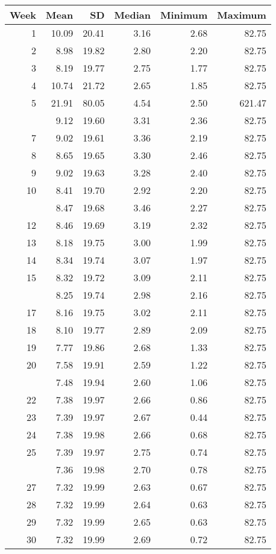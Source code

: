 \documentclass[10pt,letterpaper]{article}
\begin{document}
\begin{tabular}{rrrrrr}
\toprule
Week & Mean & SD & Median & Minimum & Maximum\\
\midrule
1 & 10.09 & 20.41 & 3.16 & 2.68 & 82.75\\
2 & 8.98 & 19.82 & 2.80 & 2.20 & 82.75\\
3 & 8.19 & 19.77 & 2.75 & 1.77 & 82.75\\
4 & 10.74 & 21.72 & 2.65 & 1.85 & 82.75\\
5 & 21.91 & 80.05 & 4.54 & 2.50 & 621.47\\
\addlinespace
6 & 9.12 & 19.60 & 3.31 & 2.36 & 82.75\\
7 & 9.02 & 19.61 & 3.36 & 2.19 & 82.75\\
8 & 8.65 & 19.65 & 3.30 & 2.46 & 82.75\\
9 & 9.02 & 19.63 & 3.28 & 2.40 & 82.75\\
10 & 8.41 & 19.70 & 2.92 & 2.20 & 82.75\\
\addlinespace
11 & 8.47 & 19.68 & 3.46 & 2.27 & 82.75\\
12 & 8.46 & 19.69 & 3.19 & 2.32 & 82.75\\
13 & 8.18 & 19.75 & 3.00 & 1.99 & 82.75\\
14 & 8.34 & 19.74 & 3.07 & 1.97 & 82.75\\
15 & 8.32 & 19.72 & 3.09 & 2.11 & 82.75\\
\addlinespace
16 & 8.25 & 19.74 & 2.98 & 2.16 & 82.75\\
17 & 8.16 & 19.75 & 3.02 & 2.11 & 82.75\\
18 & 8.10 & 19.77 & 2.89 & 2.09 & 82.75\\
19 & 7.77 & 19.86 & 2.68 & 1.33 & 82.75\\
20 & 7.58 & 19.91 & 2.59 & 1.22 & 82.75\\
\addlinespace
21 & 7.48 & 19.94 & 2.60 & 1.06 & 82.75\\
22 & 7.38 & 19.97 & 2.66 & 0.86 & 82.75\\
23 & 7.39 & 19.97 & 2.67 & 0.44 & 82.75\\
24 & 7.38 & 19.98 & 2.66 & 0.68 & 82.75\\
25 & 7.39 & 19.97 & 2.75 & 0.74 & 82.75\\
\addlinespace
26 & 7.36 & 19.98 & 2.70 & 0.78 & 82.75\\
27 & 7.32 & 19.99 & 2.63 & 0.67 & 82.75\\
28 & 7.32 & 19.99 & 2.64 & 0.63 & 82.75\\
29 & 7.32 & 19.99 & 2.65 & 0.63 & 82.75\\
30 & 7.32 & 19.99 & 2.69 & 0.72 & 82.75\\
\bottomrule
\end{tabular}
\end{document}
